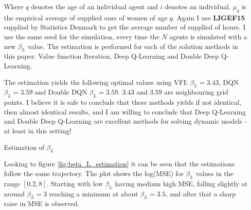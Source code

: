 Where $q$ denotes the age of an individual agent and $i$ denotes an individual. $\mu_q$ is the empirical average of supplied ours of women of age $q$. Again I use \textbf{LIGEF15} supplied by Statistics Denmark to get the average number of supplied of hours. I use the same seed for the simulation, every time the $N$ agents is simulated with a new $\beta_L$ value. The estimation is performed for each of the solution methods in this paper: Value function Iteration, Deep Q-Learning and Double Deep Q-Learning. 

The estimation yields the following optimal values using VFI: $\beta_L=3.43$, DQN $\beta_L=3.59$ and Double DQN $\beta_L=3.59$. $3.43$ and $3.59$ are neighbouring grid points. I believe it is safe to conclude that these methods yields if not identical, then almost identical results, and I am willing to conclude that Deep Q-Learning and Double Deep Q-Learning are excellent methods for solving dynamic models - at least in this setting!

\begin{table}[ht]
    \centering
    
    \caption{Estimation of $\beta_L$}
    \label{tab:beta_L_Estimation}
\end{table}

Looking to figure \ref{fig:beta_L_estimation} it can be seen that the estimations follow the same trajectory. The plot shows the log(MSE) for $\beta_L$ values in the range $[0.2, 8]$. Starting with low $\beta_L$ having medium high MSE, falling slightly at around $\beta_L = 3$ reaching a minimum at about $\beta_L = 3.5$, and after that a sharp raise in MSE is observed. 

